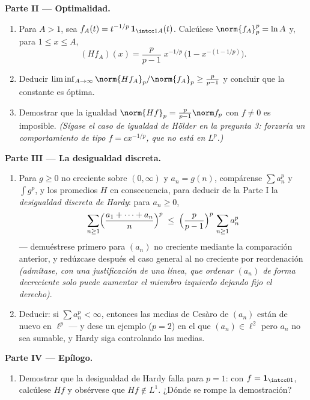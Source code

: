 \begin{problem}
\medskip
\noindent\textbf{Parte II --- Optimalidad.}
\begin{enumerate}[resume]
  \item Para $A > 1$, sea $f_A(t) = t^{-1/p}\,\mathbf
        1_{\intcc1A}(t)$. Calcúlese $\norm{f_A}_p^p = \ln A$ y, para
  $1 \leq x \leq A$,
        \[
        (Hf_A)(x) = \frac p{p-1}\;x^{-1/p}\,
        \bigl(1 - x^{-(1 - 1/p)}\bigr).
        \]
  \item Deducir $\liminf_{A\to\infty} \norm{Hf_A}_p/
        \norm{f_A}_p \geq \frac{p}{p-1}$ y concluir que la constante es
  óptima. \item Demostrar que la igualdad $\norm{Hf}_p = \frac
        p{p-1}\norm f_p$ con $f \neq 0$ es imposible. \emph{(Sígase el
  caso de igualdad de Hölder en la pregunta 3: forzaría un
  comportamiento de tipo $f = cx^{-1/p}$, que no está en $L^p$.)}
\end{enumerate}

\medskip
\noindent\textbf{Parte III --- La desigualdad discreta.}
\begin{enumerate}[resume]
  \item Para $g \geq 0$ no creciente sobre $(0,\infty)$ y $a_n = g(n)$,
  compárense $\sum a_n^p$ y $\int g^p$, y los promedios $H$ en
  consecuencia, para deducir de la Parte I la \emph{desigualdad discreta
  de Hardy}: para $a_n \geq 0$,
        \[
        \sum_{n\geq1}\Bigl(\frac{a_1 + \dots +
        a_n}{n}\Bigr)^{p}
        \;\leq\;
        \Bigl(\frac{p}{p-1}\Bigr)^{p}\,\sum_{n\geq1}a_n^p
        \]
        --- demuéstrese primero para $(a_n)$ no creciente mediante la
        comparación anterior, y redúzcase después el caso general al no
        creciente por reordenación \emph{(admítase, con una
        justificación de una línea, que ordenar $(a_n)$ de forma
        decreciente solo puede aumentar el miembro izquierdo dejando
        fijo el derecho)}. \item Deducir: si $\sum a_n^p < \infty$,
        entonces las medias de Cesàro de $(a_n)$ están de nuevo en
        $\ell^p$ --- y dese un ejemplo ($p = 2$) en el que
        $(a_n) \in \ell^2$ pero $a_n$ no sea sumable, y Hardy siga
        controlando las medias.
\end{enumerate}

\medskip
\noindent\textbf{Parte IV --- Epílogo.}
\begin{enumerate}[resume]
  \item Demostrar que la desigualdad de Hardy falla para $p = 1$: con
  $f = \mathbf 1_{\intcc01}$, calcúlese $Hf$ y obsérvese que
  $Hf \notin L^1$. ¿Dónde se rompe la demostración?
\end{enumerate}


\end{problem}
